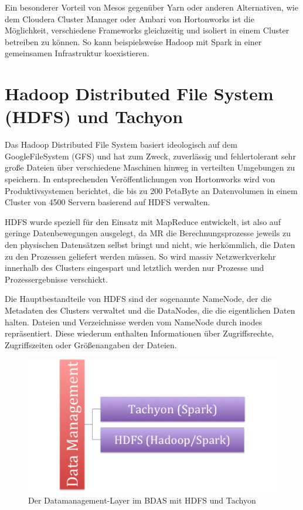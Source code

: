 Ein besonderer Vorteil von Mesos gegenüber Yarn oder anderen Alternativen, wie dem Cloudera Cluster Manager oder Ambari von Hortonworks ist die Möglichkeit, verschiedene Frameworks gleichzeitig und isoliert in einem Cluster betreiben zu können. So kann beispielsweise Hadoop mit Spark in einer gemeinsamen Infrastruktur koexistieren.   
	
\section{Hadoop Distributed File System (HDFS) und Tachyon}
\label{section:hadoop Distributed File System (HDFS) und Tachyon}


Das Hadoop Distributed File System basiert ideologisch auf dem GoogleFileSystem (GFS) und hat zum Zweck, zuverlässig und fehlertolerant sehr große Dateien über verschiedene Maschinen hinweg in verteilten Umgebungen zu speichern. In entsprechenden Veröffentlichungen von Hortonworks  wird von Produktivsystemen berichtet, die bis zu 200 PetaByte an Datenvolumen in einem Cluster von 4500 Servern basierend auf HDFS verwalten.

HDFS wurde speziell für den Einsatz mit MapReduce entwickelt, ist also auf geringe Datenbewegungen ausgelegt, da MR die Berechnungsprozesse jeweils zu den physischen Datensätzen selbst bringt und nicht, wie herkömmlich, die Daten zu den Prozessen geliefert werden müssen. So wird massiv Netzwerkverkehr innerhalb des Clusters eingespart und letztlich werden nur Prozesse und Prozessergebnisse verschickt.  

Die Hauptbestandteile von HDFS sind der sogenannte NameNode, der die Metadaten des Clusters verwaltet und die DataNodes, die die eigentlichen Daten halten. Dateien und Verzeichnisse werden vom NameNode durch inodes repräsentiert. Diese wiederum enthalten Informationen über Zugriffsrechte, Zugriffszeiten oder Größenangaben der Dateien.



\begin{figure}[htb!] 
\centering
\includegraphics[width=1.0\textwidth]{bilder/2_3_stack.png}
\caption{Der Datamanagement-Layer im BDAS mit HDFS und Tachyon}
\label{fig:datamgmtlayer}
\end{figure} 

